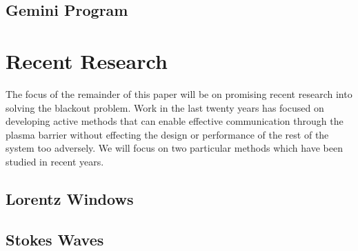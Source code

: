 \documentclass[twocolumn]{article}
\begin{document}
	\subsection*{Gemini Program}
	

\section{Recent Research} \label{sec:Solutions}
	The focus of the remainder of this paper will be on promising recent research into solving the blackout problem.
	Work in the last twenty years has focused on developing active methods that can enable effective communication through the plasma barrier without effecting the design or performance of the rest of the system too adversely.
	We will focus on two particular methods which have been studied in recent years.
	
\subsection*{Lorentz Windows}
\subsection*{Stokes Waves}



\end{document}
